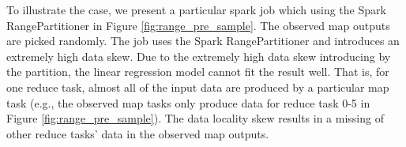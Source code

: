 {To illustrate the case, we present a particular spark job which using the Spark RangePartitioner in Figure \ref{fig:range_pre_sample}. 
The observed map outputs are picked randomly. 
The job uses the Spark RangePartitioner and introduces an extremely high data skew.
Due to the extremely high data skew introducing by the partition, the linear regression model cannot fit the result well.
That is, for one reduce task, almost all of the input data are produced by a particular map task (e.g., the observed map tasks only produce data for reduce task 0-5 in Figure \ref{fig:range_pre_sample}).
The data locality skew results in a missing of other reduce tasks' data in the observed map outputs.

}
